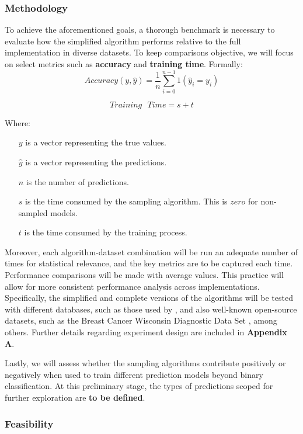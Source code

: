 \documentclass{article}
\theoremstyle{plain}
\theoremstyle{definition}
\theoremstyle{remark}
\begin{document}
\subsubsection{Methodology}

To achieve the aforementioned goals, a thorough benchmark is necessary to evaluate how the simplified algorithm performs relative to the full implementation in diverse datasets. To keep comparisons objective, we will focus on select metrics such as \textbf{accuracy} and \textbf{training time}. Formally:
$$
Accuracy(y, \hat{y}) = \frac{1}{n} \sum_{i=0}^{n-1} 1(\hat{y}_i = y_i)
$$

$$
Training\text{ }Time = s + t
$$

Where:

\begin{itemize}

\item[$y$] is a vector representing the true values.
\item[$\hat{y}$] is a vector representing the predictions.
\item[$n$] is the number of predictions.
\item[$s$] is the time consumed by the sampling algorithm. This is $zero$ for non-sampled models.
\item[$t$] is the time consumed by the training process.


\end{itemize}

Moreover, each algorithm-dataset combination will be run an adequate number of times for statistical relevance, and the key metrics are to be captured each time. Performance comparisons will be made with average values. This practice will allow for more consistent performance analysis across implementations. Specifically, the simplified and complete versions of the algorithms will be tested with different databases, such as those used by \citeauthor{chow24}, and also well-known open-source datasets, such as the Breast Cancer Wisconsin Diagnostic Data Set \cite{breastcancer}, among others. Further details regarding experiment design are included in \textbf{Appendix A}.

Lastly, we will assess whether the sampling algorithms contribute positively or negatively when used to train different prediction models beyond binary classification. At this preliminary stage, the types of predictions scoped for further exploration are \textbf{to be defined}.


\subsubsection{Feasibility}
\end{document}
